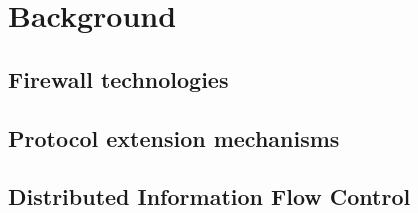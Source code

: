 \chapter{Background}
\label{background:chapter}

\section{Firewall technologies}
\label{background:firewall}

\section{Protocol extension mechanisms}
\label{background:protocols}

\section{Distributed Information Flow Control}
\label{background:difc}

